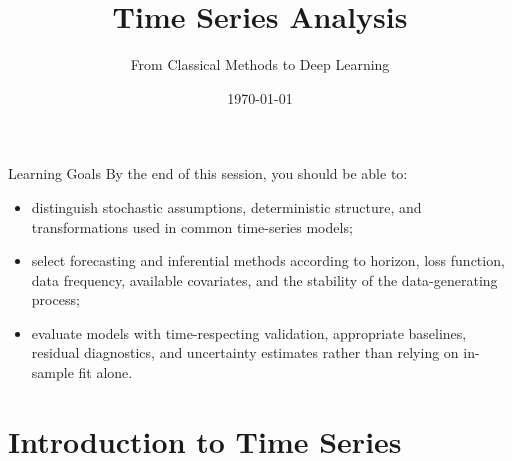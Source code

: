 \documentclass[aspectratio=169]{beamer}
\title{Time Series Analysis}
\subtitle{From Classical Methods to Deep Learning}
\date{\today}
\begin{document}

\begin{frame}
  \titlepage
\end{frame}

\begin{frame}{Learning Goals}
  By the end of this session, you should be able to:
  \begin{itemize}
    \item distinguish stochastic assumptions, deterministic structure, and transformations used in common time-series models;
    \item select forecasting and inferential methods according to horizon, loss function, data frequency, available covariates, and the stability of the data-generating process;
    \item evaluate models with time-respecting validation, appropriate baselines, residual diagnostics, and uncertainty estimates rather than relying on in-sample fit alone.
  \end{itemize}
\end{frame}

\tocslide

\section{Introduction to Time Series}
\end{document}
